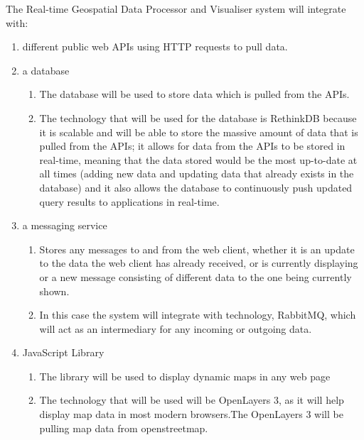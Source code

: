 The Real-time Geospatial Data Processor and Visualiser system will integrate with:
	\begin{enumerate}
		\item different public web APIs using HTTP requests to pull data.
		\item a database
			\begin{enumerate}
				\item The database will be used to store data which is pulled from the APIs.
				\item The technology that will be used for the database is RethinkDB because it is scalable and will be able to store the massive amount of data that is pulled from the APIs; it allows for data from the APIs to be stored in real-time, meaning that the data stored would be the most up-to-date at all times (adding new data and updating data that already exists in the database) and it also allows the database to continuously push updated query results to applications in real-time. 
			\end{enumerate}
		\item a messaging service
			\begin{enumerate}
				\item Stores any messages to and from the web client, whether it is an update to the data the web client has already received, or is currently displaying or a new message consisting of different data to the one being currently shown.
				\item In this case the system will integrate with technology, RabbitMQ, which will act as an intermediary for any incoming or outgoing data. 
			\end{enumerate}
		\item JavaScript Library
			\begin{enumerate}
				\item The library will be used to display dynamic maps in any web page
				\item The technology that will be used will be OpenLayers 3, as it will help display map data in most modern browsers.The OpenLayers 3 will be pulling map data from openstreetmap.
			\end{enumerate}
	\end{enumerate}
